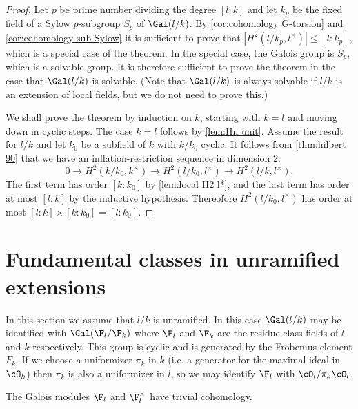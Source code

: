 \begin{proof}
	Let $p$ be prime number dividing the degree $[l:k]$ and let $k_p$ be the fixed field
	of a Sylow $p$-subgroup $S_p$ of $\Gal(l/k)$.
	By \ref{cor:cohomology G-torsion} and \ref{cor:cohomology sub Sylow}
	it is sufficient to prove that $|H^2(l/k_p,l^\times)| \le [l:k_p]$,
	which is a special case of the theorem.
	In the special case, the Galois group is $S_p$, which is a solvable group.
	It is therefore sufficient to prove the theorem in the case that $\Gal(l/k)$ is solvable.
	(Note that $\Gal(l/k)$ is always solvable if $l/k$ is an extension of local fields,
	but we do not need to prove this.)

	We shall prove the theorem by induction on $k$, starting with $k=l$ and moving down in
	cyclic steps.
	The case $k=l$ follows by \ref{lem:Hn unit}.
	Assume the result for $l/k$ and let $k_0$ be a subfield of $k$ with $k/k_0$ cyclic.
	It follows from \ref{thm:hilbert 90} that
	we have an inflation-restriction sequence in dimension 2:
	\[
		0 \to H^2(k/k_0, k^\times) \to H^2( l/k_0, l^\times) \to H^2(l/k, l^\times).
	\]
	The first term has order $[k : k_0]$ by \ref{lem:local H2 l*}, and the last term has
	order at most $[l:k]$ by the inductive hypothesis.
	Thereofore $H^2( l/k_0, l^\times)$ has order at most $[l:k] \times [k : k_0] = [l: k_0]$.
\end{proof}

\section{Fundamental classes in unramified extensions}

In this section we assume that $l/k$ is unramified.
In this case $\Gal(l/k)$ may be identified with $\Gal(\F_l / \F_k)$ where
$\F_l$ and $\F_k$ are the residue class fields of $l$ and $k$ respectively.
This group is cyclic and is generated by the Frobenius element $F_k$.
If we choose a uniformizer $\pi_k$ in $k$ (i.e. a generator for the maximal ideal in $\cO_k$)
then $\pi_k$ is also a uniformizer in $l$, so we may identify $\F_l$ with $\cO_l / \pi_k \cO_l$.

\begin{lemma} \label{lem:finite field trivial}
	The Galois modules $\F_l$ and $\F_l^\times$ have trivial cohomology.
\end{lemma}

